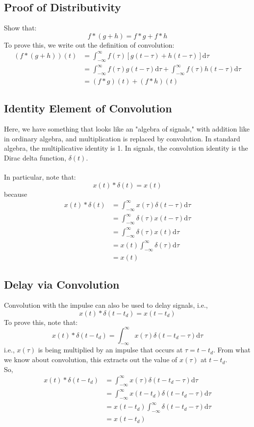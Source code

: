 \documentclass[10pt]{article}
\begin{document}
\subsection*{Proof of Distributivity}
Show that:
\[f * (g + h) = f * g + f * h\]
To prove this, we write out the definition of convolution:
\begin{align*}
    (f * (g + h))(t) &= \int_{-\infty}^\infty f(\tau)[g(t - \tau) + h(t - \tau)] \text{d}\tau\\
    &= \int_{-\infty}^\infty f(\tau) g(t - \tau) \text{d}\tau + \int_{-\infty}^\infty f(\tau) h(t - \tau) \text{d}\tau\\
    &= (f * g)(t) + (f * h)(t)
\end{align*}

\subsection*{Identity Element of Convolution}
Here, we have something that looks like an "algebra of signals," with addition like in ordinary algebra, and multiplication is replaced by convolution.  In standard algebra, the multiplicative identity is 1.  In signals, the convolution identity is the Dirac delta function, $\delta(t)$.\\\\
In particular, note that:
\[\boxed{x(t) * \delta(t) = x(t)}\]
because
\begin{align*}
    x(t) * \delta(t) &= \int_{-\infty}^\infty x(\tau) \delta(t - \tau) \text{d} \tau\\
    &= \int_{-\infty}^\infty \delta(\tau) x(t - \tau) \text{d}\tau\\
    &= \int_{-\infty}^\infty \delta(\tau)x(t) \text{d}\tau\\
    &= x(t)\int_{-\infty}^\infty \delta(\tau) \text{d}\tau\\
    &= x(t)
\end{align*}
\subsection*{Delay via Convolution}
Convolution with the impulse can also be used to delay signals, i.e.,
\[\boxed{x(t) * \delta(t - t_d) = x(t - t_d)}\]
To prove this, note that:
\[x(t) * \delta(t - t_d) = \int_{-\infty}^\infty x(\tau) \delta(t - t_d - \tau)\text{d}\tau\]
i.e., $x(\tau)$ is being multiplied by an impulse that occurs at $\tau = t - t_d$.  From what we know about convolution, this extracts out the value of $x(\tau)$ at $t - t_d$.\\
So,
\begin{align*}
    x(t) * \delta(t - t_d) &= \int_{-\infty}^\infty x(\tau) \delta(t - t_d - \tau) \text{d}\tau\\
    &= \int_{-\infty}^\infty x(t - t_d) \delta(t - t_d - \tau) \text{d}\tau\\
    &= x(t - t_d) \int_{-\infty}^\infty \delta(t - t_d - \tau) \text{d}\tau\\
    &= x(t - t_d)
\end{align*}
\end{document}
